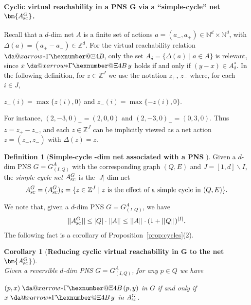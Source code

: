 \documentclass[11pt,a4paper]{amsart}
\makeatletter
\newcommand{\virtual}[1]{\mathrel{\xdashrightarrow{#1}}\hspace{-0.3em}}
\newcommand{\vreach}{\virtual{*}}
\newcommand{\D}{{}_{\delta}}
\newcommand{\nnorm}[1]{||#1||}
\newcommand{\ASC}{A_{\textsc{sc}}}
\newcommand{\Nat}{\mathbb{N}}
\newcommand{\Zset}{\mathbb{Z}}
\newcommand{\setN}{\Nat}
\newcommand{\setZ}{\Zset}
\newcommand*{\da@rightarrow}{\mathchar"0\hexnumber@\symAMSa 4B }
\newcommand*{\xdashrightarrow}[2][]{%
  \mathrel{%
    \mathpalette{\da@xarrow{#1}{#2}{}\da@rightarrow{\,}{}}{}%
  }%
}
\newcommand*{\da@xarrow}[7]{%
  \sbox0{$\ifx#7\scriptstyle\scriptscriptstyle\else\scriptstyle\fi#5#1#6\m@th$}%
  \sbox2{$\ifx#7\scriptstyle\scriptscriptstyle\else\scriptstyle\fi#5#2#6\m@th$}%
  \sbox4{$#7\dabar@\m@th$}%
  \dimen@=\wd0 %
  \ifdim\wd2 >\dimen@
    \dimen@=\wd2 %
  \fi
  \count@=2 %
  \def\da@bars{\dabar@\dabar@}%
  \@whiledim\count@\wd4<\dimen@\do{%
    \advance\count@\@ne
    \expandafter\def\expandafter\da@bars\expandafter{%
      \da@bars
      \dabar@ 
    }%
  }%
  \mathrel{#3}%
  \mathrel{%
    \mathop{\da@bars}\limits
    \ifx\\#1\\%
    \else
      _{\copy0}%
    \fi
    \ifx\\#2\\%
    \else
      ^{\copy2}%
    \fi
  }%
  \mathrel{#4}%
}
\let\origtextsc\textsc
\renewcommand{\textsc}[1]{\textnormal{\origtextsc{#1}}}
\theoremstyle{plain}
\newtheorem{cor}[thm]{Corollary}
\theoremstyle{definition}
\newtheorem{defi}[thm]{Definition}
\theoremstyle{defC}
\theoremstyle{thmC}
\makeatother
\begin{document}
\paragraph{Cyclic virtual reachability in a PNS $\bm{G}$ via a
``simple-cycle'' net $\bm{\ASC^G}$.}
Recall that a $d$-dim net $A$ is a finite set of actions
 $a=(a_-,a_+)\in\setN^d\times\setN^d$, with
$\Delta(a)=(a_+-a_-)\in\setZ^d$. For the virtual reachability relation $\vreach$,
only the set $A\D=\{\Delta(a)\mid a\in A\}$ is relevant, since
$x\vreach y$ holds
if and only if $(y-x)\in A\D^*$. 
In the following definition, for $z\in \setZ^J$ we
use the notation $z_+$, $z_-$ where, for each $i\in J$,
\begin{center}
$z_+(i)=\max\{z(i),0\}$ and $z_-(i)=\max\{-z(i),0\}$.
\end{center}
	For instance, $(2,-3,0)_+=(2,0,0)$ and  $(2,-3,0)_-=(0,3,0)$.
Thus $z=z_+-z_-$, and each $z\in\setZ^J$ can be implicitly viewed as
a net action $z=(z_+,z_-)$ with $\Delta(z)=z$.


\begin{defi}[\textbf{Simple-cycle -dim net \bm{$\ASC^G$} associated with
	a PNS }]\label{def:ASC}
	Given a $d$-dim PNS $G=G^A_{(I,Q)}$ with the corresponding
	graph $(Q,E)$
and $J=[1,d]\smallsetminus I$, 
	the \emph{simple-cycle net} $\ASC^G$
is the $|J|$-dim net 
	\begin{equation*}
		\ASC^G=(\ASC^G)\D=\{z\in\setZ^J\mid z \text{ is the effect of a simple
		cycle in }(Q,E)\}.
	\end{equation*}

\end{defi}
\noindent
We note that, given a $d$-dim PNS $G=G^A_{(I,Q)}$, we have
\begin{equation}\label{eq:normASC}
\nnorm{\ASC^G}\leq |Q|\cdot\nnorm{A}\leq
	\nnorm{A}\cdot(1+\nnorm{Q})^{|I|}.
\end{equation}
The following fact is a corollary of
Proposition~\ref{prop:cycles}(2).

	\begin{cor}[\textbf{Reducing cyclic virtual reachability in
		$\bm{G}$ 
		to the net 
		$\bm{\ASC^G}$}]\label{cor:cycles}
\hfill\\
		Given a reversible $d$-dim PNS $G=G^A_{(I,Q)}$, for any $p\in Q$ we
		have 
		\begin{center}
		$(p,x)\vreach (p,y)$ in $G$ if and only if $x\vreach y$
		in $\ASC^G$.
		\end{center}			
	\end{cor}
\end{document}
